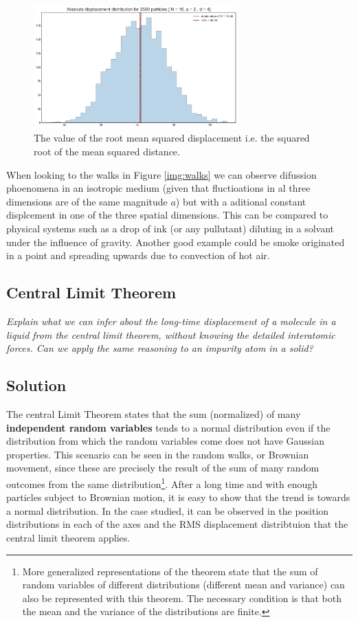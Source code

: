 \documentclass{article}
\begin{document}
\begin{figure}[h]
\centering
\includegraphics[width=0.7\textwidth]{imgs/d_randomwalk.png}
\caption{ The value of the root mean squared displacement i.e. the squared root of the mean squared distance.}
\end{figure}

When looking to the walks in Figure \ref{img:walks} we can observe difussion phoenomena in an isotropic medium (given that fluctioations in al three dimensions are of the same magnitude $a$) but with a aditional constant displcement in one of the three spatial dimensions. This can be compared  to physical systems such as a drop of ink (or any pullutant) diluting in a solvant under the influence of gravity. Another good example could be smoke originated in a point and spreading upwards due to convection of hot air.  

\subsection{Central Limit Theorem}
\textit{Explain what we can infer about the long-time displacement of a molecule in a liquid from the central limit theorem, without knowing the detailed interatomic forces. Can we apply the same reasoning to an impurity atom in a solid?}

\subsection*{Solution}
The central Limit Theorem states that the sum (normalized) of many \textbf{independent random variables} tends to a normal distribution even if the distribution from which the random variables come does not have Gaussian properties. This scenario can be seen in the random walks, or Brownian movement, since these are precisely the result of the sum of many random outcomes from the same distribution\footnote{More generalized representations of the theorem state that the sum of random variables of different distributions (different mean and variance) can also be represented with this theorem. The necessary condition is that both the mean and the variance of the distributions are finite.}. After a long time and with enough particles subject to Brownian motion, it is easy to show that the trend is towards a normal distribution. In the case studied, it can be observed in the position distributions in each of the axes and the RMS displacement distribtuion that the central limit theorem applies.
\end{document}
